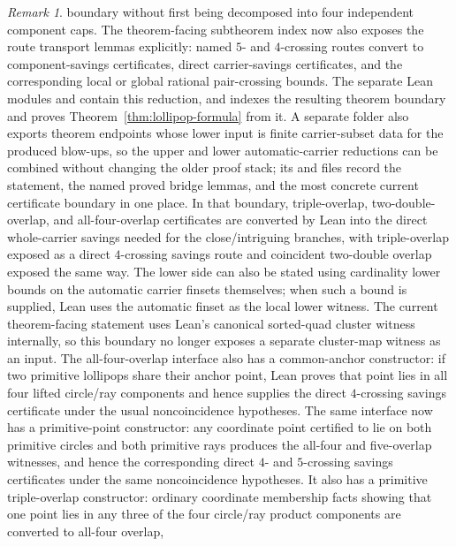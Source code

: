 \documentclass[12pt]{article}
\theoremstyle{plain}
\theoremstyle{definition}
\theoremstyle{remark}
\newtheorem{remark}[theorem]{Remark}
\begin{document}
\begin{remark}
boundary without first being decomposed into four independent component
caps.  The theorem-facing subtheorem index now also exposes the route
transport lemmas explicitly: named \(5\)- and \(4\)-crossing routes convert to
component-savings certificates, direct carrier-savings certificates, and the
corresponding local or global rational pair-crossing bounds.  The separate Lean modules
 and
 contain this reduction, and
 indexes the resulting theorem
boundary and proves Theorem~\ref{thm:lollipop-formula} from it.  A separate
 folder also exports theorem endpoints whose
lower input is finite carrier-subset data for the produced blow-ups, so the
upper and lower automatic-carrier reductions can be combined without changing
the older proof stack; its  and 
files record the statement, the named proved bridge lemmas, and the most
concrete current certificate boundary in one place.  In that boundary,
triple-overlap, two-double-overlap, and all-four-overlap certificates are
converted by Lean into the direct whole-carrier savings needed for the
close/intriguing branches, with triple-overlap exposed as a direct
\(4\)-crossing savings route and coincident two-double overlap exposed the
same way.  The lower side can also be stated using
cardinality lower bounds on the automatic carrier finsets themselves; when
such a bound is supplied, Lean uses the automatic finset as the local lower
witness.  The current theorem-facing statement uses Lean's canonical
sorted-quad cluster witness internally, so this boundary no longer exposes a
separate cluster-map witness as an input.  The
all-four-overlap interface also has a common-anchor constructor: if two
primitive lollipops share their anchor point, Lean proves that point lies in
all four lifted circle/ray components and hence supplies the direct
\(4\)-crossing savings certificate under the usual noncoincidence hypotheses.
The same interface now has a primitive-point constructor: any coordinate
point certified to lie on both primitive circles and both primitive rays
produces the all-four and five-overlap witnesses, and hence the corresponding
direct \(4\)- and \(5\)-crossing savings certificates under the same
noncoincidence hypotheses.  It also has a primitive triple-overlap constructor:
ordinary coordinate membership facts showing that one point lies in any three
of the four circle/ray product components are converted to all-four overlap,

\end{remark}
\end{document}
